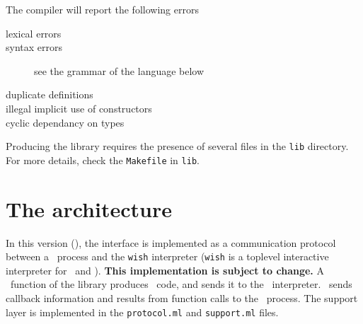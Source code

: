 The compiler will report the following errors
\begin{description}
\item[lexical errors]
\item[syntax errors] see the grammar of the language below
\item[duplicate definitions]
\item[illegal implicit use of constructors]
\item[cyclic dependancy on types]
\end{description} 

Producing the library requires the presence of several files in the
\verb|lib| directory. For more details, check the \verb|Makefile| in
\verb|lib|. 

\section{The architecture}
In this version (\thisrelease), the interface is implemented as a
communication protocol between a \caml\ process and the {\tt wish}
interpreter ({\tt wish} is a toplevel interactive interpreter for 
\tcl\ and \tk).
{\bf This implementation is subject to change.}
A \caml\ function of the library produces \tcl\tk\ code, and sends it to the
\wish\ interpreter. \wish\ sends callback information and results from
function calls to the \caml\ process.
The support layer is implemented in the \verb|protocol.ml| and
\verb|support.ml| files.

